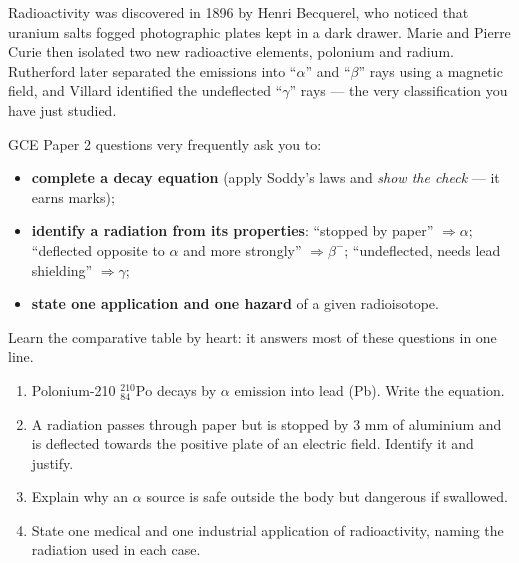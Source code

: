 \documentclass[11pt]{article}
\begin{document}
\begin{savaistu}
Radioactivity was discovered in 1896 by Henri Becquerel, who noticed that uranium salts fogged photographic plates kept in a dark drawer. Marie and Pierre Curie then isolated two new radioactive elements, polonium and radium. Rutherford later separated the emissions into ``$\alpha$'' and ``$\beta$'' rays using a magnetic field, and Villard identified the undeflected ``$\gamma$'' rays — the very classification you have just studied.
\end{savaistu}

\begin{attention}
GCE Paper 2 questions very frequently ask you to:
\begin{itemize}
\item \textbf{complete a decay equation} (apply Soddy's laws and \emph{show the check} — it earns marks);
\item \textbf{identify a radiation from its properties}: ``stopped by paper'' $\Rightarrow \alpha$; ``deflected opposite to $\alpha$ and more strongly'' $\Rightarrow \beta^-$; ``undeflected, needs lead shielding'' $\Rightarrow \gamma$;
\item \textbf{state one application and one hazard} of a given radioisotope.
\end{itemize}
Learn the comparative table by heart: it answers most of these questions in one line.
\end{attention}

\begin{exercice}[Practice]
\begin{enumerate}
\item Polonium-210 $\ensuremath{\mathrm{^{210}_{84}Po}}$ decays by $\alpha$ emission into lead (Pb). Write the equation.
\item A radiation passes through paper but is stopped by 3 mm of aluminium and is deflected towards the positive plate of an electric field. Identify it and justify.
\item Explain why an $\alpha$ source is safe outside the body but dangerous if swallowed.
\item State one medical and one industrial application of radioactivity, naming the radiation used in each case.
\end{enumerate}
\end{exercice}
\end{document}
